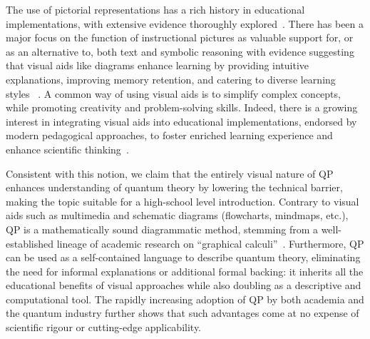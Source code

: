 The use of pictorial representations has a rich history in educational implementations, with extensive evidence thoroughly explored~\cite{tversky2004semantics}. There has been a major focus on the function of instructional pictures as valuable support for, or as an alternative to, both text and symbolic reasoning \cite{bobek2016creating, mielicki2015affordances, herrlinger2017pictures}
with evidence suggesting that visual aids like diagrams enhance learning by providing intuitive explanations, improving memory retention, and catering to diverse learning styles~ \cite{verdi1997organized}. A common way of using visual aids is to simplify complex concepts, while promoting creativity and problem-solving skills. Indeed, there is a growing interest in integrating visual aids into educational implementations, endorsed by modern pedagogical approaches, to foster enriched learning experience and enhance scientific thinking~\cite{mayer2005cambridge, carney2002pictorial, fan2015drawing}.

Consistent with this notion, we claim that the entirely visual nature of QP enhances understanding of quantum theory by lowering the technical barrier, making the topic suitable for a high-school level introduction.
Contrary to visual aids such as multimedia and schematic diagrams (flowcharts, mindmaps, etc.), QP is a mathematically sound diagrammatic method, stemming from a well-established lineage of academic research on ``graphical calculi''~\cite{coecke2022kindergarden}. Furthermore, QP can be used as a self-contained language to describe quantum theory, eliminating the need for informal explanations or additional formal backing: it inherits all the educational benefits of visual approaches while also doubling as a descriptive and computational tool.
The rapidly increasing adoption of QP by both academia and the quantum industry further shows that such advantages come at no expense of scientific rigour or cutting-edge applicability.

